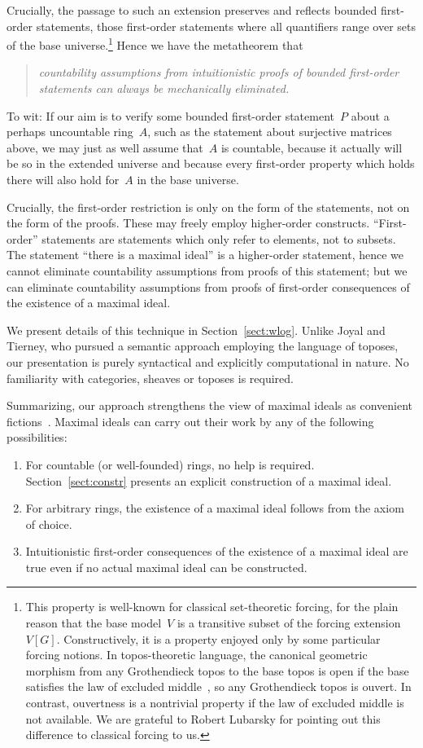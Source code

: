 \documentclass[com,11pt,crcready]{iosart2x}
\theoremstyle{definition}
\theoremstyle{plain}
\theoremstyle{remark}
\renewcommand{\_}{\mathpunct{.}\,}
\begin{document}
Crucially, the passage to such an extension preserves and reflects
bounded first-order statements, those first-order statements where all
quantifiers range over sets of the base universe.\footnote{This property is well-known for classical
set-theoretic forcing, for the plain reason that the base model~$V$ is a
transitive subset of the forcing extension~$V[G]$. Constructively, it is a property enjoyed only by some
particular forcing notions. In topos-theoretic language, the canonical
geometric morphism from any Grothendieck topos to the base topos is open
if the base satisfies the law of excluded middle~\cite[p.~57]{joyal-tierney:grothendieck}, so any Grothendieck topos is
ouvert. In contrast, ouvertness is a nontrivial property if the law of excluded
middle is not available. We are grateful to Robert Lubarsky for pointing out
this difference to classical forcing to us.}
Hence we have the metatheorem that
\begin{quote}\emph{countability
assumptions from intuitionistic proofs of bounded first-order statements can always be
mechanically eliminated.}\end{quote}
To wit: If our aim is to verify some bounded first-order
statement~$P$ about a perhaps uncountable ring~$A$, such as the statement about
surjective matrices above, we may just as well assume that~$A$ is countable,
because it actually will be so in the extended universe and because every
first-order property which holds there will also hold for~$A$ in the base
universe.

Crucially, the first-order restriction is only on the form
of the statements, not on the form of the proofs. These may freely employ higher-order constructs.
``First-order'' statements are statements which only refer to elements, not to
subsets. The statement ``there is a maximal ideal'' is a higher-order
statement, hence we cannot eliminate countability assumptions from proofs of
this statement; but we can eliminate countability assumptions from proofs of
first-order consequences of the existence of a maximal ideal.

We present details of this technique in Section~\ref{sect:wlog}. Unlike
Joyal and Tierney, who pursued a semantic approach employing the language of
toposes, our presentation is purely syntactical and explicitly computational in
nature. No familiarity with categories, sheaves or toposes is required.

Summarizing, our approach strengthens the view of maximal ideals as convenient
fictions~\cite[Section~1]{schuster-wessel:krull}. Maximal ideals can carry out
their work by any of the following possibilities:
\begin{enumerate}
\item[(1)] For countable (or well-founded) rings, no help is required.
Section~\ref{sect:constr} presents an explicit construction of a maximal ideal.
\item[(2)] For arbitrary rings, the existence of a maximal ideal follows from the
axiom of choice.
\item[(3)] Intuitionistic first-order consequences of the existence of a maximal
ideal are true even if no actual maximal ideal can be constructed.
\end{enumerate}
\end{document}
